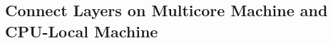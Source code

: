 
\subsection{Connect Layers on Multicore Machine and CPU-Local Machine}
\label{chapter:certikos:subsec:connect-multicore}


